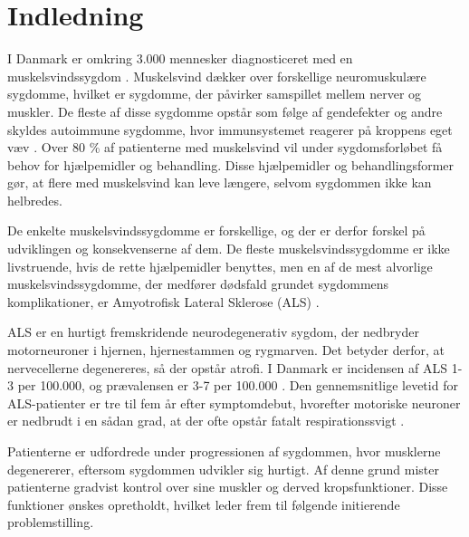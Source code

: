 \section{Indledning}



I Danmark er omkring 3.000 mennesker diagnosticeret med en muskelsvindssygdom \citep{universitet2013}. Muskelsvind dækker over forskellige neuromuskulære sygdomme, hvilket er sygdomme, der påvirker samspillet mellem nerver og muskler. De fleste af disse sygdomme opstår som følge af gendefekter og andre skyldes autoimmune sygdomme, hvor immunsystemet reagerer på kroppens eget væv \citep{arathata2014}. Over 80 \% af patienterne med muskelsvind vil under sygdomsforløbet få behov for hjælpemidler og behandling. Disse hjælpemidler og behandlingsformer gør, at flere med muskelsvind kan leve længere, selvom sygdommen ikke kan helbredes. 

De enkelte muskelsvindssygdomme er forskellige, og der er derfor forskel på udviklingen og konsekvenserne af dem. De fleste muskelsvindssygdomme er ikke livstruende, hvis de rette hjælpemidler benyttes, men en af de mest alvorlige muskelsvindssygdomme, der medfører dødsfald grundet sygdommens komplikationer, er Amyotrofisk Lateral Sklerose (ALS) \citep{henschke2012}. 

ALS er en hurtigt fremskridende neurodegenerativ sygdom, der nedbryder motorneuroner i hjernen, hjernestammen og rygmarven. Det betyder derfor, at nervecellerne degenereres, så der opstår atrofi. I Danmark er incidensen af ALS 1-3 per 100.000, og prævalensen er 3-7 per 100.000 \citep{russell2015}. Den gennemsnitlige levetid for ALS-patienter er tre til fem år efter symptomdebut, hvorefter motoriske neuroner er nedbrudt i en sådan grad, at der ofte opstår fatalt respirationssvigt \citep{grehl2011, morris2015}.

Patienterne er udfordrede under progressionen af sygdommen, hvor musklerne degenererer, eftersom sygdommen udvikler sig hurtigt. Af denne grund mister patienterne gradvist kontrol over sine muskler og derved kropsfunktioner. Disse funktioner ønskes opretholdt, hvilket leder frem til følgende initierende problemstilling. 
 
